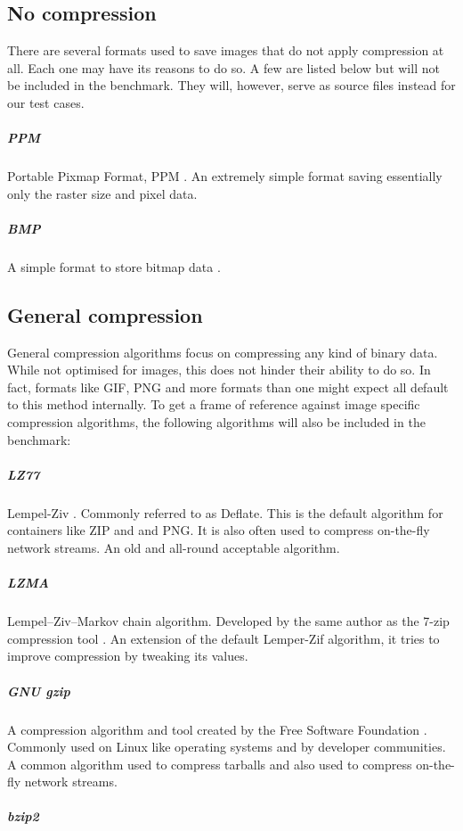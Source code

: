 \documentclass[11pt,a4paper]{report}
\begin{document}
\subsection{No compression}

There are several formats used to save images that do not apply compression at all. Each one may have its reasons to do so. A few are listed below but will not be included in the benchmark. They will, however, serve as source files instead for our test cases.

\subparagraph{PPM}

Portable Pixmap Format, PPM \cite{ppm}. An extremely simple format saving essentially only the raster size and pixel data.

\subparagraph{BMP}

A simple format to store bitmap data \cite{bmp}.

\subsection{General compression}

General compression algorithms focus on compressing any kind of binary data. While not optimised for images, this does not hinder their ability to do so. In fact, formats like GIF, PNG and more formats than one might expect all default to this method internally. To get a frame of reference against image specific compression algorithms, the following algorithms will also be included in the benchmark:
 
\subparagraph{LZ77}

Lempel-Ziv \cite{LZ77}. Commonly referred to as Deflate. This is the default algorithm for containers like ZIP and and PNG. It is also often used to compress on-the-fly network streams. An old and all-round acceptable algorithm.

\subparagraph{LZMA}

Lempel–Ziv–Markov chain algorithm. Developed by the same author as the 7-zip compression tool \cite{7zip}. An extension of the default Lemper-Zif algorithm, it tries to improve compression by tweaking its values.

\subparagraph{GNU gzip}

A compression algorithm and tool created by the Free Software Foundation \cite{gzip}. Commonly used on Linux like operating systems and by developer communities. A common algorithm used to compress tarballs and also used to compress on-the-fly network streams.

\subparagraph{bzip2}
\end{document}
